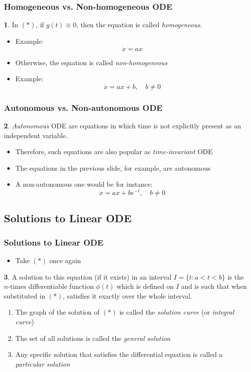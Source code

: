 \documentclass[10pt,usenames,dvipsnames]{beamer}
\theoremstyle{definition}
\newtheorem{definition}{\translate{Definition}}
\begin{document}
\begin{frame}[fragile]
\frametitle{Homogeneous vs. Non-homogeneous ODE}
\begin{definition}
	In $(*)$, if $g(t) \equiv 0$, then the equation is called \textit{homogeneous}.
\end{definition}
\begin{itemize}
	\item Example:
	\[
		\dot{x} = ax
	\]
	\item Otherwise, the equation is called \textit{non-homogeneous}
		\item Example:
	\[
		\dot{x} = ax + b, \quad b \neq 0
	\]
\end{itemize}
\end{frame}

\begin{frame}[fragile]
\frametitle{Autonomous vs. Non-autonomous ODE}
\begin{definition}
	\textit{Autonomous} ODE are equations in which time is not explicitly present as an independent variable.	
\end{definition}
\begin{itemize}
	\item Therefore, such equations are also popular as \textit{time-invariant} ODE
	\item The equations in the previous slide, for example, are autonomous
	\item A non-autonomous one would be for instance:
	\[
		\dot{x} = ax + be^{-t}, \quad b \neq 0
	\]
\end{itemize}
\end{frame}

\subsection{Solutions to Linear ODE}
\begin{frame}[fragile]
\frametitle{Solutions to Linear ODE}
\begin{itemize}
	\item Take $(*)$ once again
\end{itemize}
\begin{definition}
	A solution to this equation (if it exists) in an interval $I = \{t: a < t < b\}$ is the $n$-times differentiable function $\phi(t)$ which is defined on $I$ and is such that when substituted in $(*)$, satisfies it exactly over the whole interval.
\end{definition}
\begin{enumerate}
	\item The graph of the solution of $(*)$ is called the \textit{solution curve} (or \textit{integral curve})
	\item The set of all solutions is called the \textit{general solution}
	\item Any specific solution that satisfies the differential equation is called a \textit{particular solution}
\end{enumerate}
\end{frame}
\end{document}
